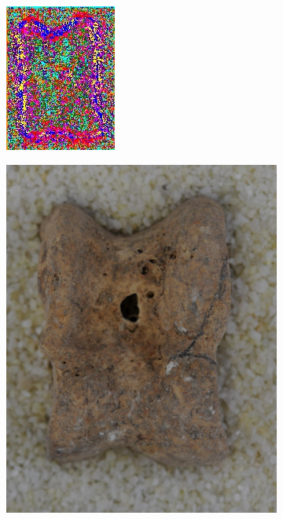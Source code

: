 \documentclass[pdftex,12pt,a4paper]{report}
\begin{document}
\begin{figure}[h]
\begin{subfigure}[b]{0.24\textwidth}
		\includegraphics[width=.9\linewidth]{img/segmentation/good/textural-edges/segmented.jpg}
		\subcaption*{}
		\label{}
	\end{subfigure}
	\begin{subfigure}[b]{0.24\textwidth}
		\centering
		\includegraphics[width=.9\linewidth]{img/segmentation/bad/textural-edges/cut.jpg}

\end{subfigure}
\end{figure}
\end{document}
